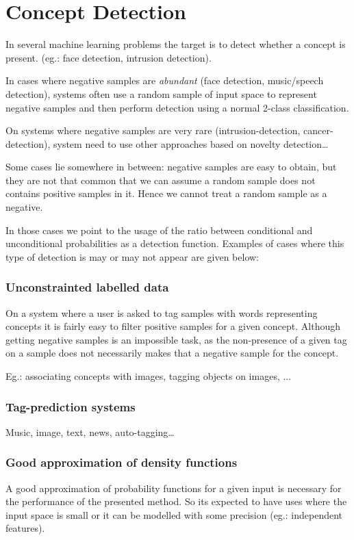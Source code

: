 \documentclass[a4paper]{article}
\begin{document}
\section{Concept Detection}
\label{sec:detection}


In several machine learning problems the target is to detect whether a concept is present.
(eg.: face detection, intrusion detection).

In cases where negative samples are \emph{abundant} (face detection, music/speech detection), systems often use a random sample of input space to represent negative samples and then perform detection using a normal 2-class classification.

On systems where negative samples are very rare (intrusion-detection, cancer-detection), system need to use other approaches based on novelty detection\dots

Some cases lie somewhere in between: negative samples are easy to obtain, but they are not that common that we can assume a random sample does not contains positive samples in it. Hence we cannot treat a random sample as a negative.

In those cases we point to the usage of the ratio between conditional and unconditional probabilities as a detection function.
Examples of cases where this type of detection is may or may not appear are given below:

\subsubsection*{Unconstrainted labelled data}
On a system where a user is asked to tag samples with words representing concepts it is fairly easy to filter positive samples for a given concept.
Although getting negative samples is an impossible task, as the non-presence of a given tag on a sample does not necessarily makes that a negative sample for the concept.

Eg.: associating concepts with images, tagging objects on images, ...

\subsubsection*{Tag-prediction systems}
Music, image, text, news, auto-tagging\dots

\subsubsection*{Good approximation of density functions}
A good approximation of probability functions for a given input is necessary for the performance of the presented method.
So its expected to have uses where the input space is small or it can be modelled with some precision (eg.: independent features).
\end{document}

